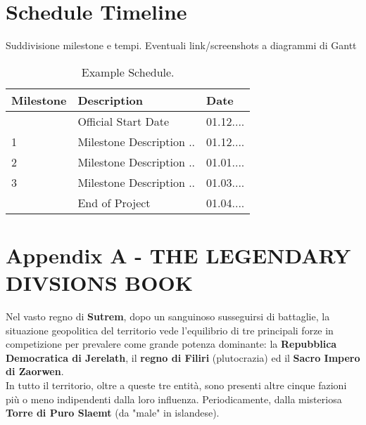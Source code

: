 \documentclass[a4paper]{scrreprt}
\begin{document}

\chapter{Schedule Timeline}
Suddivisione milestone e tempi. Eventuali link/screenshots a diagrammi di Gantt

\begin{table}[h]
\centering
\begin{tabular}{|l|l|l|}
\hline
Milestone & Description & Date \\\hline
& Official Start Date & 01.12.... \\
1 & Milestone Description ..  & 01.12.... \\
2 & Milestone Description ..  & 01.01.... \\
3 & Milestone Description ..  & 01.03.... \\
& End of Project & 01.04.... \\
\hline
\end{tabular}
\caption{\label{tab:schedule}Example Schedule.}
\end{table}

\chapter{Appendix A - THE LEGENDARY DIVSIONS BOOK}
Nel vasto regno di \textbf{Sutrem}, dopo un sanguinoso susseguirsi di battaglie, la situazione geopolitica del territorio vede l'equilibrio di tre principali forze in competizione per prevalere come grande potenza dominante: la \textbf{Repubblica Democratica di Jerelath}, il \textbf{regno di Filiri} (plutocrazia) ed il \textbf{Sacro Impero di Zaorwen}.\\
In tutto il territorio, oltre a queste tre entità, sono presenti altre cinque fazioni più o meno indipendenti dalla loro influenza. Periodicamente, dalla misteriosa \textbf{Torre di Puro Slaemt} (da "male" in islandese).
\end{document}
